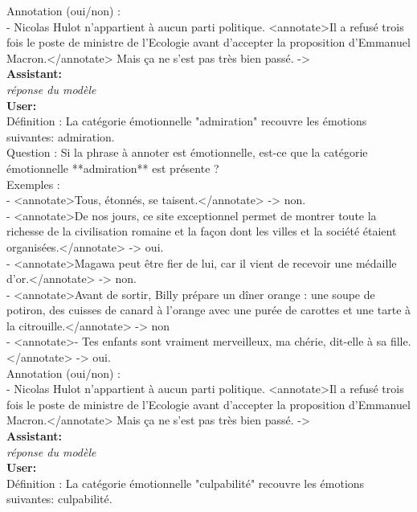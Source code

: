 {Annotation (oui/non) :\\
- Nicolas Hulot n’appartient à aucun parti politique. <annotate>Il a refusé trois fois le poste de ministre de l’Ecologie avant d’accepter la proposition d’Emmanuel Macron.</annotate> Mais ça ne s’est pas très bien passé.  -> \\

\textbf{Assistant:}\\
\textit{réponse du modèle}\\

\textbf{User:}\\
Définition : La catégorie émotionnelle "admiration" recouvre les émotions suivantes: admiration.\\

Question : Si la phrase à annoter est émotionnelle, est-ce que la catégorie émotionnelle **admiration** est présente ?\\

Exemples :\\
- <annotate>Tous, étonnés, se taisent.</annotate> -> non.\\
- <annotate>De nos jours, ce site exceptionnel permet de montrer toute la richesse de la civilisation romaine et la façon dont les villes et la société étaient organisées.</annotate> -> oui.\\
- <annotate>Magawa peut être fier de lui, car il vient de recevoir une médaille d'or.</annotate> -> non.\\
- <annotate>Avant de sortir, Billy prépare un dîner orange : une soupe de potiron, des cuisses de canard à l'orange avec une purée de carottes et une tarte à la citrouille.</annotate> -> non\\
- <annotate>- Tes enfants sont vraiment merveilleux, ma chérie, dit-elle à sa fille.</annotate> -> oui.\\

Annotation (oui/non) :\\
- Nicolas Hulot n’appartient à aucun parti politique. <annotate>Il a refusé trois fois le poste de ministre de l’Ecologie avant d’accepter la proposition d’Emmanuel Macron.</annotate> Mais ça ne s’est pas très bien passé.  -> \\

\textbf{Assistant:}\\
\textit{réponse du modèle}\\

\textbf{User:}\\
Définition : La catégorie émotionnelle "culpabilité" recouvre les émotions suivantes: culpabilité.\\

}
